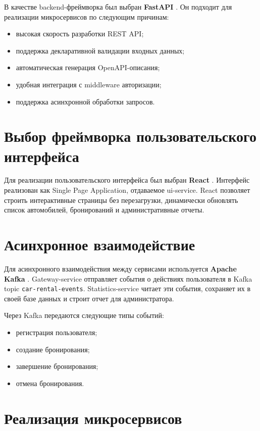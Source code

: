 В качестве backend-фреймворка был выбран \textbf{FastAPI} \cite{fastapi}. Он подходит для реализации микросервисов по следующим причинам:

\begin{itemize}
  \item высокая скорость разработки REST API;
  \item поддержка декларативной валидации входных данных;
  \item автоматическая генерация OpenAPI-описания;
  \item удобная интеграция с middleware авторизации;
  \item поддержка асинхронной обработки запросов.
\end{itemize}

\section{Выбор фреймворка пользовательского интерфейса}

Для реализации пользовательского интерфейса был выбран \textbf{React} \cite{react}. Интерфейс реализован как Single Page Application, отдаваемое ui-service. React позволяет строить интерактивные страницы без перезагрузки, динамически обновлять список автомобилей, бронирований и административные отчеты.

\section{Асинхронное взаимодействие}

Для асинхронного взаимодействия между сервисами используется \textbf{Apache Kafka} \cite{kafka}. Gateway-service отправляет события о действиях пользователя в Kafka topic \texttt{car-rental-events}. Statistics-service читает эти события, сохраняет их в своей базе данных и строит отчет для администратора.

Через Kafka передаются следующие типы событий:

\begin{itemize}
  \item регистрация пользователя;
  \item создание бронирования;
  \item завершение бронирования;
  \item отмена бронирования.
\end{itemize}

\section{Реализация микросервисов}

